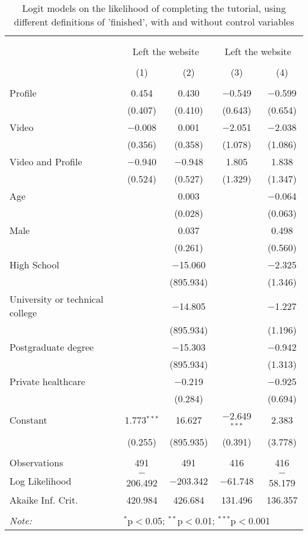 
\begin{table}[H] \centering 
  \caption{Logit models on the likelihood of completing the tutorial, using different definitions of 'finished', 
          with and without control variables} 
  \label{tbl:finished_tutorial} 
\begin{tabular}{@{\extracolsep{5pt}}lcccc} 
\\[-1.8ex]\hline 
\hline \\[-1.8ex] 
\\[-1.8ex] & \multicolumn{2}{c}{Left the website} & \multicolumn{2}{c}{Left the website} \\ 
\\[-1.8ex] & (1) & (2) & (3) & (4)\\ 
\hline \\[-1.8ex] 
 Profile & 0.454 & 0.430 & $-$0.549 & $-$0.599 \\ 
  & (0.407) & (0.410) & (0.643) & (0.654) \\ 
  Video & $-$0.008 & 0.001 & $-$2.051 & $-$2.038 \\ 
  & (0.356) & (0.358) & (1.078) & (1.086) \\ 
  Video and Profile & $-$0.940 & $-$0.948 & 1.805 & 1.838 \\ 
  & (0.524) & (0.527) & (1.329) & (1.347) \\ 
  Age &  & 0.003 &  & $-$0.064 \\ 
  &  & (0.028) &  & (0.063) \\ 
  Male &  & 0.037 &  & 0.498 \\ 
  &  & (0.261) &  & (0.560) \\ 
  High School &  & $-$15.060 &  & $-$2.325 \\ 
  &  & (895.934) &  & (1.346) \\ 
  University or technical college &  & $-$14.805 &  & $-$1.227 \\ 
  &  & (895.934) &  & (1.196) \\ 
  Postgraduate degree &  & $-$15.303 &  & $-$0.942 \\ 
  &  & (895.934) &  & (1.313) \\ 
  Private healthcare &  & $-$0.219 &  & $-$0.925 \\ 
  &  & (0.284) &  & (0.694) \\ 
  Constant & 1.773$^{***}$ & 16.627 & $-$2.649$^{***}$ & 2.383 \\ 
  & (0.255) & (895.935) & (0.391) & (3.778) \\ 
 \hline \\[-1.8ex] 
Observations & 491 & 491 & 416 & 416 \\ 
Log Likelihood & $-$206.492 & $-$203.342 & $-$61.748 & $-$58.179 \\ 
Akaike Inf. Crit. & 420.984 & 426.684 & 131.496 & 136.357 \\ 
\hline 
\hline \\[-1.8ex] 
\textit{Note:}  & \multicolumn{4}{l}{$^{*}$p$<$0.05; $^{**}$p$<$0.01; $^{***}$p$<$0.001} \\ 
\end{tabular} 
\end{table} 
